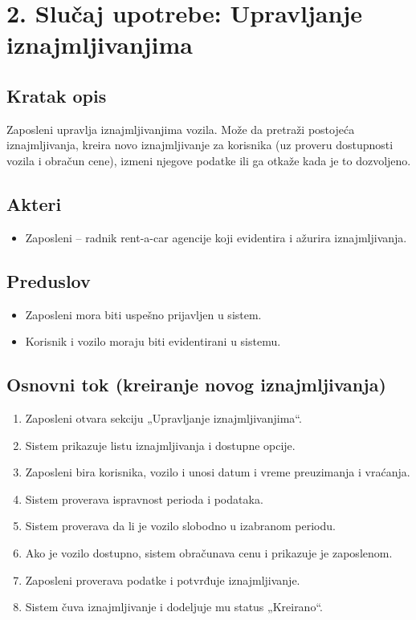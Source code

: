 \documentclass[12pt,a4paper]{article}
\begin{document}

\section*{2. Slučaj upotrebe: Upravljanje iznajmljivanjima}

\subsection*{Kratak opis}

Zaposleni upravlja iznajmljivanjima vozila. Može da pretraži postojeća
iznajmljivanja, kreira novo iznajmljivanje za korisnika (uz proveru
dostupnosti vozila i obračun cene), izmeni njegove podatke ili ga
otkaže kada je to dozvoljeno.

\subsection*{Akteri}

\begin{itemize}
    \item Zaposleni -- radnik rent-a-car agencije koji evidentira i ažurira iznajmljivanja.
\end{itemize}

\subsection*{Preduslov}

\begin{itemize}
    \item Zaposleni mora biti uspešno prijavljen u sistem.
    \item Korisnik i vozilo moraju biti evidentirani u sistemu.
\end{itemize}

\subsection*{Osnovni tok (kreiranje novog iznajmljivanja)}

\begin{enumerate}
    \item Zaposleni otvara sekciju „Upravljanje iznajmljivanjima“.
    \item Sistem prikazuje listu iznajmljivanja i dostupne opcije.
    \item Zaposleni bira korisnika, vozilo i unosi datum i vreme preuzimanja i vraćanja.
    \item Sistem proverava ispravnost perioda i podataka.
    \item Sistem proverava da li je vozilo slobodno u izabranom periodu.
    \item Ako je vozilo dostupno, sistem obračunava cenu i prikazuje je zaposlenom.
    \item Zaposleni proverava podatke i potvrđuje iznajmljivanje.
    \item Sistem čuva iznajmljivanje i dodeljuje mu status „Kreirano“.
\end{enumerate}
\end{document}
